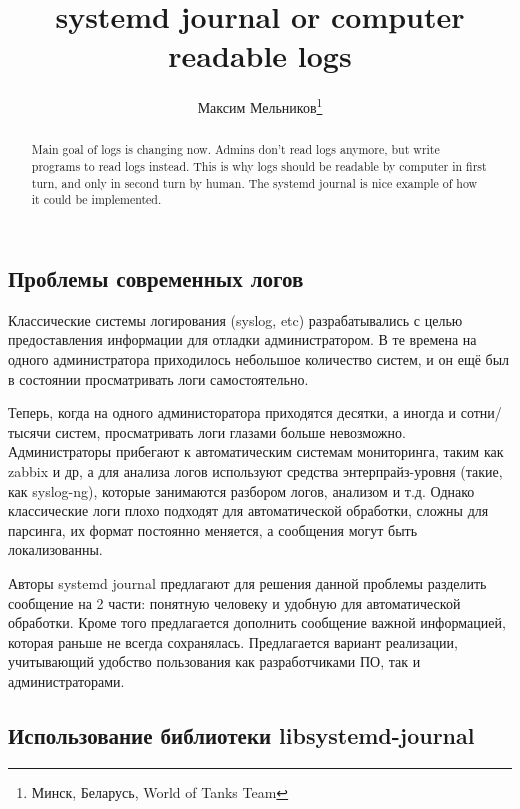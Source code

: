 \documentclass[10pt, a5paper]{article}
\begin{document}
\title{systemd journal or computer readable logs}%

\author{Максим Мельников\footnote{Минск, Беларусь, World of Tanks Team}}
\maketitle

\begin{abstract}
Main goal of logs is changing now. Admins don't read logs anymore, but write programs to read logs instead. This is why logs should be readable by computer in first turn, and only in second turn by human.
The systemd journal is nice example of how it could be implemented.
\end{abstract}

\subsection*{Проблемы современных логов}

Классические системы логирования (syslog, etc) разрабатывались с целью предоставления информации для отладки администратором. В те времена на одного администратора приходилось небольшое количество систем, и он ещё был в состоянии просматривать логи самостоятельно.

Теперь, когда на одного администоратора приходятся десятки, а иногда и сотни/тысячи систем, просматривать логи глазами больше невозможно. Администраторы прибегают к автоматическим системам мониторинга, таким как zabbix и др, а для анализа логов используют средства энтерпрайз-уровня (такие, как syslog-ng), которые занимаются разбором логов, анализом и т.д. Однако классические логи плохо подходят для автоматической обработки, сложны для парсинга, их формат постоянно меняется, а сообщения могут быть локализованны.

Авторы systemd journal предлагают для решения данной проблемы разделить сообщение на 2 части: понятную человеку и удобную для автоматической обработки. Кроме того предлагается дополнить сообщение важной информацией, которая раньше не всегда сохранялась. Предлагается вариант реализации, учитывающий удобство пользования как разработчиками ПО, так и администраторами.

\newpage
\subsection*{Использование библиотеки libsystemd-journal}
\end{document}
